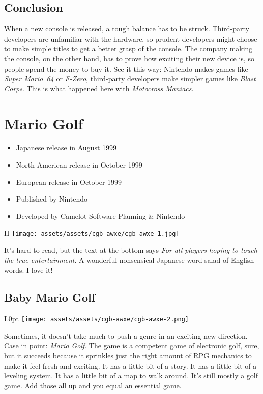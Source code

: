 \documentclass{book}
\begin{document}
\FloatBarrier\needspace{5pt}\section*{Conclusion}\nopagebreak[4]

When a new console is released, a tough balance has to be struck. Third-party developers are unfamiliar with the hardware, so prudent developers might choose to make simple titles to get a better grasp of the console. The company making the console, on the other hand, has to prove how exciting their new device is, so people spend the money to buy it. See it this way: Nintendo makes games like \emph{Super Mario 64} or \emph{F-Zero}, third-party developers make simpler games like \emph{Blast Corps}. This is what happened here with \emph{Motocross Maniacs}.


\begingroup \chapter*{Mario Golf} \endgroup

\begin{itemize} \setlength\itemsep{-0.4em}
\item Japanese release in August 1999
\item North American release in October 1999
\item European release in October 1999
\item Published by Nintendo
\item Developed by Camelot Software Planning \& Nintendo
\end{itemize}\noindent

\begin{wrapfigure}{H}{\linewidth}
\vskip 4pt
\centering \texttt{[image: assets/assets/cgb-awxe/cgb-awxe-1.jpg]}\par\pagetwodescription It’s hard to read, but the text at the bottom says \emph{For all players hoping to touch the true entertainment}. A wonderful nonsensical Japanese word salad of English words. I love it!\end{wrapfigure}
\clearpage

\FloatBarrier\needspace{5pt}\section*{Baby Mario Golf}\nopagebreak[4]

\begin{wrapfigure}{L}{0pt} \texttt{[image: assets/assets/cgb-awxe/cgb-awxe-2.png]}\end{wrapfigure}
Sometimes, it doesn’t take much to push a genre in an exciting new direction. Case in point: \emph{Mario Golf}. The game is a competent game of electronic golf, sure, but it succeeds because it sprinkles just the right amount of RPG mechanics to make it feel fresh and exciting. It has a little bit of a story. It has a little bit of a leveling system. It has a little bit of a map to walk around. It’s still mostly a golf game. Add those all up and you equal an essential game.
\end{document}
